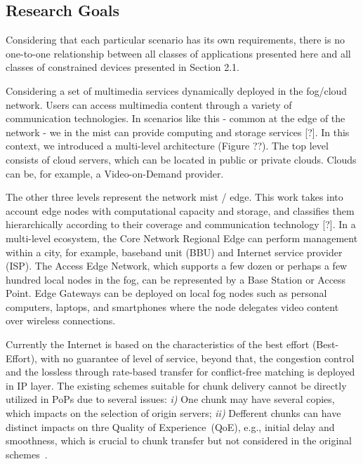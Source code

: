 
\subsection*{Research Goals}
\label{sec:research-goals}

Considering that each particular scenario has its own requirements, there is no one-to-one relationship between all classes of applications presented here and all classes of constrained devices presented in Section 2.1.


Considering a set of multimedia services dynamically deployed in the fog/cloud network. Users can access multimedia content through a variety of communication technologies. In scenarios like this - common at the edge of the network - we in the mist can provide computing and storage services [?]. In this context, we introduced a multi-level architecture (Figure ??). The top level consists of cloud servers, which can be located in public or private clouds. Clouds can be, for example, a Video-on-Demand provider.

The other three levels represent the network mist / edge. This work takes into account edge nodes with computational capacity and storage, and classifies them hierarchically according to their coverage and communication technology [?]. In a multi-level ecosystem, the Core Network Regional Edge can perform management within a city, for example, baseband unit (BBU) and Internet service provider (ISP). The Access Edge Network, which supports a few dozen or perhaps a few hundred local nodes in the fog, can be represented by a Base Station or Access Point. Edge Gateways can be deployed on local fog nodes such as personal computers, laptops, and smartphones where the node delegates video content over wireless connections.


Currently the Internet is based on the characteristics of the best effort (Best-Effort), with no guarantee of level of service, beyond that, the congestion control and the lossless through rate-based transfer for conflict-free matching is deployed in IP layer. The existing schemes suitable for chunk delivery cannot be directly utilized in PoPs due to several issues:
\textit{i)} One chunk may have several copies, which impacts on the selection of origin servers; \textit{ii)} Defferent chunks can have distinct impacts on thre Quality of Experience~(QoE), e.g., initial delay and smoothness, which is crucial to chunk transfer but not considered in the original schemes~\cite{shenIWQoS19}.


